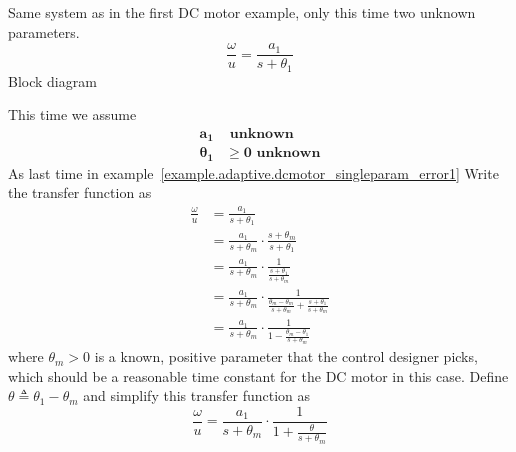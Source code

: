 \begin{example}\label{ex:dcmotor_multiparam_error1}
  Same system as in the first DC motor example, only this time two unknown parameters.
  \begin{equation*}
    \frac{\omega}{u}=\frac{a_{1}}{s+\theta_{1}}
  \end{equation*}
  Block diagram
  \begin{center}
  \end{center}
  This time we assume
  \begin{align*}
    \boldsymbol{a_{1}}&\textbf{~unknown} \\
    \boldsymbol{\theta_{1}}&\boldsymbol{\geq0}\textbf{~unknown}
  \end{align*}
  As last time in example~\ref{example.adaptive.dcmotor_singleparam_error1} Write the transfer function as
  \begin{align*}
    \frac{\omega}{u}&=\frac{a_{1}}{s+\theta_{1}} \\
    &=\frac{a_{1}}{s+\theta_{m}}\cdot\frac{s+\theta_{m}}{s+\theta_{1}} \\
    &=\frac{a_{1}}{s+\theta_{m}}\cdot\frac{1}{\frac{s+\theta_{1}}{s+\theta_{m}}} \\
    &=\frac{a_{1}}{s+\theta_{m}}\cdot\frac{1}{\frac{\theta_{m}-\theta_{m}}{s+\theta_{m}}+\frac{s+\theta_{1}}{s+\theta_{m}}} \\
    &=\frac{a_{1}}{s+\theta_{m}}\cdot\frac{1}{1-\frac{\theta_{m}-\theta_{1}}{s+\theta_{m}}}
  \end{align*}
  where $\theta_{m}>0$ is a known, positive parameter that the control designer picks, which should be a reasonable time constant for the DC motor in this case.
  Define $\theta\triangleq\theta_{1}-\theta_{m}$ and simplify this transfer function as
  \begin{equation*}
    \frac{\omega}{u}=\frac{a_{1}}{s+\theta_{m}}\cdot\frac{1}{1+\frac{\theta}{s+\theta_{m}}}

\end{equation*}
\end{example}
